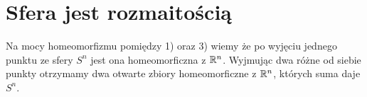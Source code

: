 \section*{Sfera jest rozmaitością}
Na mocy homeomorfizmu pomiędzy 1) oraz 3) wiemy że po wyjęciu jednego punktu ze sfery $S^n$
jest ona homeomorficzna z ${\mathbb{R}}^n$. Wyjmując dwa różne od siebie punkty otrzymamy dwa otwarte zbiory homeomorficzne z ${\mathbb{R}}^n$, których suma daje $S^n$.
